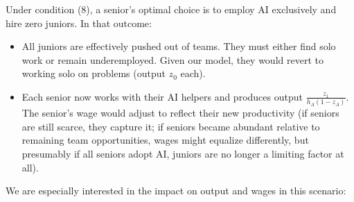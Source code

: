 \documentclass[12pt]{article}
\begin{document}
Under condition (8), a {senior's optimal choice} is to employ AI
exclusively and {hire zero juniors}. In that outcome:

\begin{itemize}

\item
  All juniors are effectively {pushed out} of teams. They must
  either find solo work or remain underemployed. Given our model, they
  would revert to working solo on problems (output \(z_0\) each).
\item
  Each senior now works with their AI helpers and produces output
  \(\frac{z_1}{h_A(1-z_A)}\). The {senior's wage} would adjust to
  reflect their new productivity (if seniors are still scarce, they
  capture it; if seniors became abundant relative to remaining team
  opportunities, wages might equalize differently, but presumably if all
  seniors adopt AI, juniors are no longer a limiting factor at all).
\end{itemize}

We are especially interested in the {impact on output and wages}
in this scenario:
\end{document}
